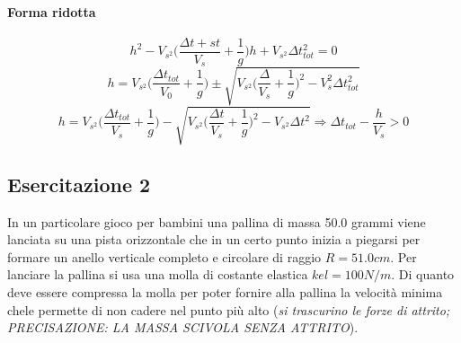\documentclass{book}
\begin{document}
\paragraph{Forma ridotta\label{forma ridotta es.1.1}}
\begin{equation*}
	h^2-V_{s^2}\bigg(\frac{\Delta t+st}{V_s}+\frac{1}{g}\bigg)h+V_{s^2}\Delta t_{tot}^2=0
\end{equation*}
\begin{equation*}
	h=V_{s^2}\bigg(\frac{\Delta t_{tot}}{V_0}+\frac{1}{g}\bigg)\pm \sqrt{V_{s^2}\bigg(\frac{\Delta}{V_s}+\frac{1}{g}\bigg)^2-V^2_s\Delta t^2_{tot}}
\end{equation*}
\begin{equation*}
	h=V_{s^2}\bigg(\frac{\Delta t_{tot}}{V_s}+\frac{1}{g}\bigg)-\sqrt{V_{s^2}\bigg(\frac{\Delta t}{V_s}+\frac{1}{g}\bigg)^2-V_{s^2}\Delta t^2}\Rightarrow \Delta t_{tot}-\frac{h}{V_s}>0
\end{equation*}
\subsection{Esercitazione 2}
In un particolare gioco per bambini una pallina di massa 50.0 grammi viene lanciata su una pista orizzontale   che   in   un   certo   punto   inizia   a   piegarsi   per   formare   un   anello   verticale   completo  e circolare di raggio $R= 51.0 cm$.  Per lanciare la pallina si usa una molla di costante elastica $kel=100N/m$. Di quanto deve essere compressa la molla per poter fornire alla pallina la velocità  minima chele permette di non cadere nel punto più alto (\textit{si trascurino le forze di attrito; PRECISAZIONE: LA MASSA SCIVOLA SENZA ATTRITO}). 
\end{document}
